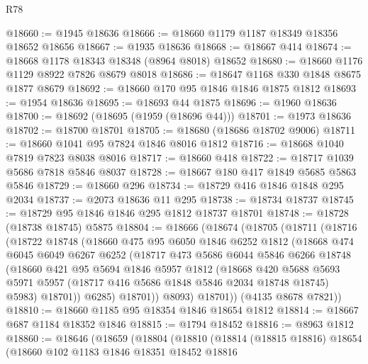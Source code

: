 \begin{lexlean}{R78}
\begin{coremodule}
@18660 := @1945 @18636
@18666 := @18660 @1179 @1187 @18349 @18356 @18652 @18656
@18667 := @1935 @18636
@18668 := @18667 @414
@18674 := @18668 @1178 @18343 @18348 (@8964 @8018) @18652
@18680 := @18660 @1176 @1129 @8922 @7826 @8679 @8018
@18686 := @18647 @1168 @330 @1848 @8675 @1877 @8679
@18692 := @18660 @170 @95 @1846 @1846 @1875 @1812
@18693 := @1954 @18636
@18695 := @18693 @44 @1875
@18696 := @1960 @18636
@18700 := @18692 (@18695 (@1959 (@18696 @44)))
@18701 := @1973 @18636
@18702 := @18700 @18701
@18705 := @18680 (@18686 @18702 @9006)
@18711 := @18660 @1041 @95 @7824 @1846 @8016 @1812
@18716 := @18668 @1040 @7819 @7823 @8038 @8016
@18717 := @18660 @418
@18722 := @18717 @1039 @5686 @7818 @5846 @8037
@18728 := @18667 @180 @417 @1849 @5685 @5863 @5846
@18729 := @18660 @296
@18734 := @18729 @416 @1846 @1848 @295 @2034
@18737 := @2073 @18636 @11 @295
@18738 := @18734 @18737
@18745 := @18729 @95 @1846 @1846 @295 @1812 @18737 @18701
@18748 := @18728 (@18738 @18745) @5875
@18804 := @18666
    (@18674
      (@18705
        (@18711
          (@18716
            (@18722
              @18748
              (@18660
                @475
                @95
                @6050
                @1846
                @6252
                @1812
                (@18668
                  @474
                  @6045
                  @6049
                  @6267
                  @6252
                  (@18717
                    @473
                    @5686
                    @6044
                    @5846
                    @6266
                    @18748
                    (@18660
                      @421
                      @95
                      @5694
                      @1846
                      @5957
                      @1812
                      (@18668
                        @420
                        @5688
                        @5693
                        @5971
                        @5957
                        (@18717 @416 @5686 @1848 @5846 @2034 @18748 @18745)
                        @5983)
                      @18701))
                  @6285)
                @18701))
            @8093)
          @18701))
      (@4135 @8678 @7821))
@18810 := @18660 @1185 @95 @18354 @1846 @18654 @1812
@18814 := @18667 @687 @1184 @18352 @1846
@18815 := @1794 @18452
@18816 := @8963 @1812
@18860 := @18646
    (@18659
      (@18804
        (@18810
          (@18814
            (@18815 @18816)
            @18654
            (@18660
              @102
              @1183
              @1846
              @18351
              @18452
              @18816

\end{coremodule}
\end{lexlean}
